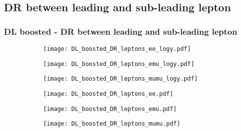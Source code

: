 \documentclass[aspectratio=169,8pt]{beamer}
\begin{document}
\subsection{DR between leading and sub-leading lepton}
\begin{frame}
\frametitle{DL boosted - DR between leading and sub-leading lepton}
\begin{figure}
\captionsetup[subfigure]{labelformat=empty}
\begin{subfigure}{0.32\textwidth}
\texttt{[image: DL\_boosted\_DR\_leptons\_ee\_logy.pdf]}
\vspace*{-0.15cm}
\end{subfigure}
\hfil
\begin{subfigure}{0.32\textwidth}
\texttt{[image: DL\_boosted\_DR\_leptons\_emu\_logy.pdf]}
\vspace*{-0.15cm}
\end{subfigure}
\hfil
\begin{subfigure}{0.32\textwidth}
\texttt{[image: DL\_boosted\_DR\_leptons\_mumu\_logy.pdf]}
\vspace*{-0.15cm}
\end{subfigure}
\hfil
\begin{subfigure}{0.32\textwidth}
\texttt{[image: DL\_boosted\_DR\_leptons\_ee.pdf]}
\vspace*{-0.15cm}
\end{subfigure}
\hfil
\begin{subfigure}{0.32\textwidth}
\texttt{[image: DL\_boosted\_DR\_leptons\_emu.pdf]}
\vspace*{-0.15cm}
\end{subfigure}
\hfil
\begin{subfigure}{0.32\textwidth}
\texttt{[image: DL\_boosted\_DR\_leptons\_mumu.pdf]}
\vspace*{-0.15cm}
\end{subfigure}
\hfil
\end{figure}
\end{frame}
\newpage
\end{document}
